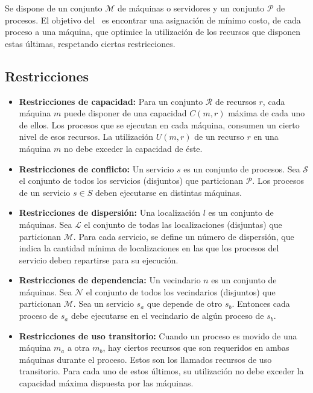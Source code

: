 
Se dispone de un conjunto $\mathcal{M}$ de máquinas o servidores y un conjunto $\mathcal{P}$ de procesos. El objetivo del \mrp\ es encontrar una asignación de mínimo costo, de cada proceso a una máquina, que optimice la utilización de los recursos que disponen estas últimas, respetando ciertas restricciones. 
\subsection{Restricciones}

\begin{itemize}
	
	\item \textbf{Restricciones de capacidad:} Para un conjunto $\mathcal{R}$ de recursos $r$, cada máquina $m$ puede disponer de una capacidad $C(m,r)$ máxima de cada uno de ellos. Los procesos que se ejecutan en cada máquina, consumen un cierto nivel de esos recursos. La utilización $U(m,r)$ de un recurso $r$ en una máquina $m$ no debe exceder la capacidad de éste. 
	
	\item \textbf{Restricciones de conflicto:} Un servicio $s$ es un conjunto de procesos. Sea $\mathcal{S}$ el conjunto de todos los servicios (disjuntos) que particionan $\mathcal{P}$. Los procesos de un servicio $s \in S$ deben ejecutarse en distintas máquinas.
	
	\item \textbf{Restricciones de dispersión:} Una localización $l$ es un conjunto de máquinas. Sea $\mathcal{L}$ el conjunto de todas las localizaciones (disjuntas) que particionan $\mathcal{M}$. Para cada servicio, se define un número de dispersión, que indica la cantidad mínima de localizaciones en las que los procesos del servicio deben repartirse para su ejecución. 
	
	\item \textbf{Restricciones de dependencia:} Un vecindario $n$ es un conjunto de máquinas. Sea $\mathcal{N}$ el conjunto de todos los vecindarios (disjuntos) que particionan $\mathcal{M}$. Sea un servicio $s_a$ que depende de otro $s_b$. Entonces cada proceso de $s_a$ debe ejecutarse en el vecindario de algún proceso de $s_b$.
	
	\item \textbf{Restricciones de uso transitorio:} Cuando un proceso es movido de una máquina $m_a$ a otra $m_b$, hay ciertos recursos que son requeridos en ambas máquinas durante el proceso. Estos son los llamados recursos de uso transitorio. Para cada uno de estos últimos, su utilización no debe exceder la capacidad máxima dispuesta por las máquinas.
	
\end{itemize}

